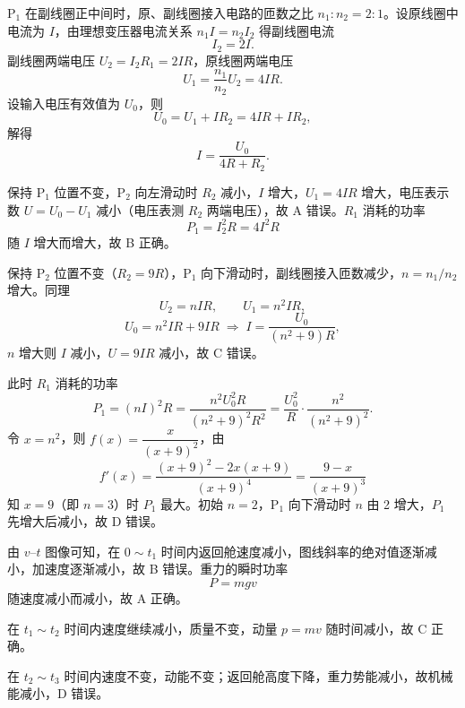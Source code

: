 \begin{answer}
$\mathrm{P}_{1}$ 在副线圈正中间时，原、副线圈接入电路的匝数之比 $n_{1}:n_{2}=2:1$。设原线圈中电流为 $I$，由理想变压器电流关系 $n_{1}I=n_{2}I_{2}$ 得副线圈电流
\[
  I_{2}=2I .
\]
副线圈两端电压 $U_{2}=I_{2}R_{1}=2IR$，原线圈两端电压
\[
  U_{1}=\frac{n_{1}}{n_{2}}U_{2}=4IR .
\]
设输入电压有效值为 $U_{0}$，则
\[
  U_{0}=U_{1}+IR_{2}=4IR+IR_{2},
\]
解得
\[
  I=\frac{U_{0}}{4R+R_{2}} .
\]

保持 $\mathrm{P}_{1}$ 位置不变，$\mathrm{P}_{2}$ 向左滑动时 $R_{2}$ 减小，$I$ 增大，$U_{1}=4IR$ 增大，电压表示数 $U=U_{0}-U_{1}$ 减小（电压表测 $R_{2}$ 两端电压），故 A 错误。$R_{1}$ 消耗的功率
\[
  P_{1}=I_{2}^{2}R=4I^{2}R
\]
随 $I$ 增大而增大，故 B 正确。

保持 $\mathrm{P}_{2}$ 位置不变（$R_{2}=9R$），$\mathrm{P}_{1}$ 向下滑动时，副线圈接入匝数减少，$n=n_{1}/n_{2}$ 增大。同理
\[
  U_{2}=nIR,\qquad U_{1}=n^{2}IR,
\]
\[
  U_{0}=n^{2}IR+9IR
  \;\Longrightarrow\;
  I=\frac{U_{0}}{(n^{2}+9)R},
\]
$n$ 增大则 $I$ 减小，$U=9IR$ 减小，故 C 错误。

此时 $R_{1}$ 消耗的功率
\[
  P_{1}=(nI)^{2}R
  =\frac{n^{2}U_{0}^{2}R}{(n^{2}+9)^{2}R^{2}}
  =\frac{U_{0}^{2}}{R}\cdot\frac{n^{2}}{(n^{2}+9)^{2}} .
\]
令 $x=n^{2}$，则 $f(x)=\dfrac{x}{(x+9)^{2}}$，由
\[
  f'(x)=\frac{(x+9)^{2}-2x(x+9)}{(x+9)^{4}}
  =\frac{9-x}{(x+9)^{3}}
\]
知 $x=9$（即 $n=3$）时 $P_{1}$ 最大。初始 $n=2$，$\mathrm{P}_{1}$ 向下滑动时 $n$ 由 2 增大，$P_{1}$ 先增大后减小，故 D 错误。
\end{answer}

\begin{answer}
由 $v$--$t$ 图像可知，在 $0\sim t_{1}$ 时间内返回舱速度减小，图线斜率的绝对值逐渐减小，加速度逐渐减小，故 B 错误。重力的瞬时功率
\[
  P=mgv
\]
随速度减小而减小，故 A 正确。

在 $t_{1}\sim t_{2}$ 时间内速度继续减小，质量不变，动量 $p=mv$ 随时间减小，故 C 正确。

在 $t_{2}\sim t_{3}$ 时间内速度不变，动能不变；返回舱高度下降，重力势能减小，故机械能减小，D 错误。
\end{answer}

